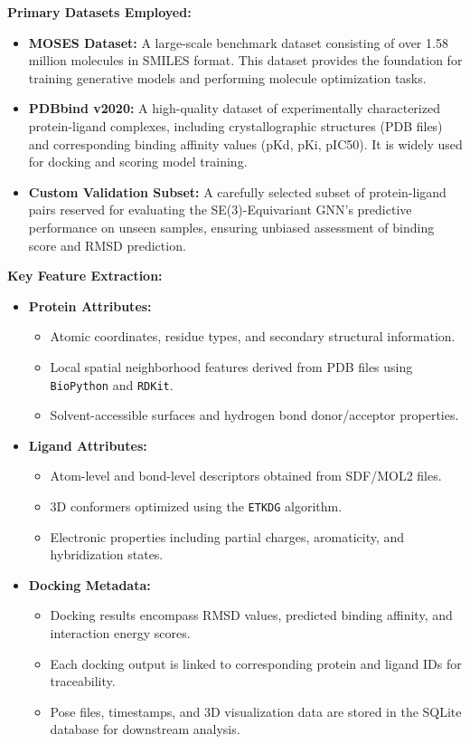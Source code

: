 \documentclass[12pt,a4]{report}
\begin{document}
\textbf{Primary Datasets Employed:}
\begin{itemize}
    \item \textbf{MOSES Dataset:} A large-scale benchmark dataset consisting of over 1.58 million molecules in SMILES format. This dataset provides the foundation for training generative models and performing molecule optimization tasks.
    \item \textbf{PDBbind v2020:} A high-quality dataset of experimentally characterized protein-ligand complexes, including crystallographic structures (PDB files) and corresponding binding affinity values (pKd, pKi, pIC50). It is widely used for docking and scoring model training.
    \item \textbf{Custom Validation Subset:} A carefully selected subset of protein-ligand pairs reserved for evaluating the SE(3)-Equivariant GNN’s predictive performance on unseen samples, ensuring unbiased assessment of binding score and RMSD prediction. 
\end{itemize}

\vspace{0.3cm}
\textbf{Key Feature Extraction:}

\begin{itemize}
    \item \textbf{Protein Attributes:}
    \begin{itemize}
        \item Atomic coordinates, residue types, and secondary structural information.
        \item Local spatial neighborhood features derived from PDB files using \texttt{BioPython} and \texttt{RDKit}.
        \item Solvent-accessible surfaces and hydrogen bond donor/acceptor properties.
    \end{itemize}

    \item \textbf{Ligand Attributes:}
    \begin{itemize}
        \item Atom-level and bond-level descriptors obtained from SDF/MOL2 files.
        \item 3D conformers optimized using the \texttt{ETKDG} algorithm.
        \item Electronic properties including partial charges, aromaticity, and hybridization states.
    \end{itemize}

    \item \textbf{Docking Metadata:}
    \begin{itemize}
        \item Docking results encompass RMSD values, predicted binding affinity, and interaction energy scores.
        \item Each docking output is linked to corresponding protein and ligand IDs for traceability.
        \item Pose files, timestamps, and 3D visualization data are stored in the SQLite database for downstream analysis.
    \end{itemize}
\end{itemize}
\end{document}
